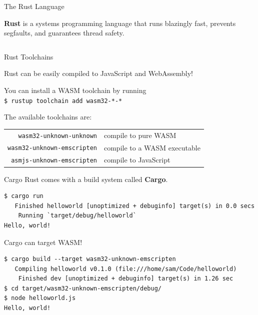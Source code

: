 \documentclass{lug}
\newcommand{\splitslide}[4]{%
    \noindent
    \begin{minipage}{#1 \textwidth - #2 }
        #3
    \end{minipage}%
    \hspace{ \dimexpr #2 * 2 \relax }%
    \begin{minipage}{\textwidth - #1 \textwidth - #2 }
        #4
    \end{minipage}
}
\begin{document}
\begin{frame}{The Rust Language}
    \splitslide{0.57}{1em}{

        \textbf{Rust} is a systems programming language that runs blazingly fast,
        prevents segfaults, and guarantees thread safety.

    } {
        \inputminted{rust}{code/demo.rs}
    }
\end{frame}

\begin{frame}[fragile]{Rust Toolchains}

    Rust can be easily compiled to JavaScript and WebAssembly!

    \vspace{2ex}

    You can install a WASM toolchain by running \\
    \texttt{\$ rustup toolchain add wasm32-*-*}

    \vspace{2ex}

    The available toolchains are:

    \begin{tabular}{rl}
        \texttt{wasm32-unknown-unknown} & compile to pure WASM \\
        \texttt{wasm32-unknown-emscripten} & compile to a WASM executable \\
        \texttt{asmjs-unknown-emscripten} & compile to JavaScript \\
    \end{tabular}

\end{frame}

\begin{frame}[fragile]{Cargo}
    Rust comes with a build system called \textbf{Cargo}.

    \vspace{2ex}

    \begin{verbatim}
$ cargo run
   Finished helloworld [unoptimized + debuginfo] target(s) in 0.0 secs
    Running `target/debug/helloworld`
Hello, world!
    \end{verbatim}

    Cargo can target WASM!

    \begin{verbatim}
$ cargo build --target wasm32-unknown-emscripten
   Compiling helloworld v0.1.0 (file:///home/sam/Code/helloworld)
    Finished dev [unoptimized + debuginfo] target(s) in 1.26 sec
$ cd target/wasm32-unknown-emscripten/debug/
$ node helloworld.js
Hello, world!
    \end{verbatim}

\end{frame}
\end{document}
